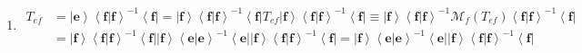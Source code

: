 \documentclass[aps,preprint]{revtex4}%
\begin{document}
\begin{enumerate}
\item
\begin{align}
T_{ef}  &  =\left\vert \mathbf{e}\right\rangle \left\langle \left.
\mathbf{f}\right\vert \mathbf{f}\right\rangle ^{-1}\left\langle \mathbf{f}%
\right\vert =\left\vert \mathbf{f}\right\rangle \left\langle \left.
\mathbf{f}\right\vert \mathbf{f}\right\rangle ^{-1}\left\langle \mathbf{f}%
\right\vert T_{ef}\left\vert \mathbf{f}\right\rangle \left\langle \left.
\mathbf{f}\right\vert \mathbf{f}\right\rangle ^{-1}\left\langle \mathbf{f}%
\right\vert \equiv\left\vert \mathbf{f}\right\rangle \left\langle \left.
\mathbf{f}\right\vert \mathbf{f}\right\rangle ^{-1}\mathcal{M}_{f}\left(
T_{ef}\right)  \left\langle \left.  \mathbf{f}\right\vert \mathbf{f}%
\right\rangle ^{-1}\left\langle \mathbf{f}\right\vert \\
&  =\left\vert \mathbf{f}\right\rangle \left\langle \left.  \mathbf{f}%
\right\vert \mathbf{f}\right\rangle ^{-1}\left\langle \mathbf{f}\right\vert
\left\vert \mathbf{f}\right\rangle \left\langle \left.  \mathbf{e}\right\vert
\mathbf{e}\right\rangle ^{-1}\left\langle \mathbf{e}\right\vert \left\vert
\mathbf{f}\right\rangle \left\langle \left.  \mathbf{f}\right\vert
\mathbf{f}\right\rangle ^{-1}\left\langle \mathbf{f}\right\vert =\left\vert
\mathbf{f}\right\rangle \left\langle \left.  \mathbf{e}\right\vert
\mathbf{e}\right\rangle ^{-1}\left\langle \mathbf{e}\right\vert \left\vert
\mathbf{f}\right\rangle \left\langle \left.  \mathbf{f}\right\vert
\mathbf{f}\right\rangle ^{-1}\left\langle \mathbf{f}\right\vert
\end{align}



\end{enumerate}
\end{document}
